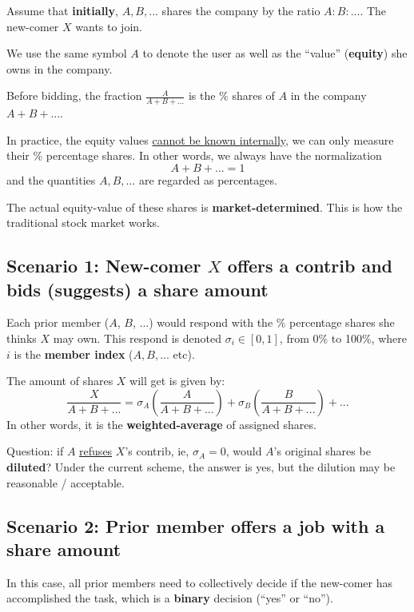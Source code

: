 \documentclass[12pt, orivec]{article}
\begin{document}
Assume that \textbf{initially}, $A, B, ...$ shares the company by the ratio $A : B : ...$.  The new-comer $X$ wants to join.

We use the same symbol $A$ to denote the user as well as the ``value'' (\textbf{equity}) she owns in the company.  

Before bidding, the fraction $\frac{A}{A + B + ...}$ is the \% shares of $A$ in the company $A + B + ...$.

In practice, the equity values \uline{cannot be known internally}, we can only measure their \% percentage shares.  In other words, we always have the normalization
\begin{equation}
A + B + ... = 1
\end{equation}
and the quantities $A, B, ...$ are regarded as percentages.

The actual equity-value of these shares is \textbf{market-determined}.  This is how the traditional stock market works.

\secttoc
\subsection{Scenario 1:  New-comer $X$ offers a contrib and bids (suggests) a share amount}

Each prior member ($A$, $B$, ...) would respond with the \% percentage shares she thinks $X$ may own.  This respond is denoted $\sigma_i \in [0,1]$, from 0\% to 100\%, where $i$ is the \textbf{member index} ($A, B, ... $ etc).

The amount of shares $X$ will get is given by:
\begin{equation}
\label{shares-assigned-to-X}
\frac{X}{A + B + ...} = \sigma_A (\frac{A}{A + B + ...}) + \sigma_B (\frac{B}{A + B + ...}) + ...
\end{equation}
In other words, it is the \textbf{weighted-average} of assigned shares.

Question:  if $A$ \uline{refuses} $X$'s contrib, ie, $\sigma_A = 0$, would $A$'s original shares be \textbf{diluted}?  Under the current scheme, the answer is yes, but the dilution may be reasonable / acceptable.

\secttoc
\subsection{Scenario 2:  Prior member offers a job with a share amount}

In this case, all prior members need to collectively decide if the new-comer has accomplished the task, which is a \textbf{binary} decision (``yes'' or ``no'').
\end{document}

